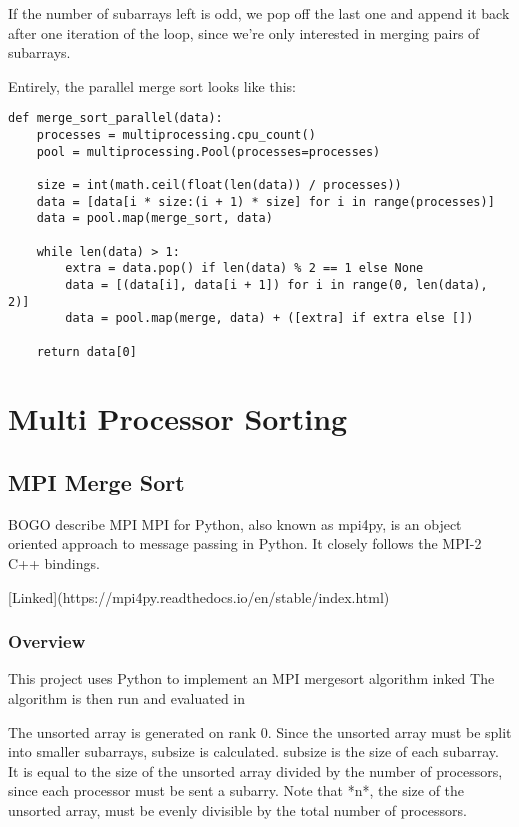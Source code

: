 If the number of subarrays left is odd, we pop off the last one and append it back after one iteration of the loop,
since we're only interested in merging pairs of subarrays.

Entirely, the parallel merge sort looks like this:

\begin{verbatim}
def merge_sort_parallel(data):
    processes = multiprocessing.cpu_count()
    pool = multiprocessing.Pool(processes=processes)

    size = int(math.ceil(float(len(data)) / processes))
    data = [data[i * size:(i + 1) * size] for i in range(processes)]
    data = pool.map(merge_sort, data)

    while len(data) > 1:
        extra = data.pop() if len(data) % 2 == 1 else None
        data = [(data[i], data[i + 1]) for i in range(0, len(data), 2)]
        data = pool.map(merge, data) + ([extra] if extra else [])

    return data[0]
\end{verbatim}

\section{Multi Processor Sorting}

\subsection{MPI Merge Sort}

BOGO describe MPI
MPI for Python, also known as mpi4py, is an object oriented approach to message passing in Python. It closely follows
the MPI-2 C++ bindings.

[Linked](https://mpi4py.readthedocs.io/en/stable/index.html)

\subsubsection{Overview}

This project uses Python to implement an MPI mergesort algorithm inked
The algorithm is then run and evaluated in

The unsorted array is generated on rank 0. Since the unsorted array must
be split into smaller subarrays, subsize is calculated. subsize is
the size of each subarray. It is equal to the size of the unsorted array
divided by the number of processors, since each processor must be sent a
subarry. Note that *n*, the size of the unsorted array, must be evenly
divisible by the total number of processors.

